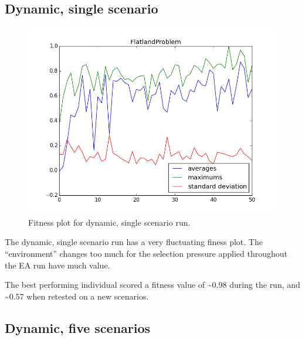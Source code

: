 \documentclass[twoside]{article}
\begin{document}
\begin{multicols}{2}
  \subsection{Dynamic, single scenario}
  
  \begin{figure}[H]
    \centering
    \includegraphics[width=\linewidth]{images/dynamic_1.png}
    \caption{Fitness plot for dynamic, single scenario run.} \label{fig:static-single}
  \end{figure}

  The dynamic, single scenario run has a very fluctuating finess plot.
  The ``environment'' changes too much for the selection pressure applied throughout the EA run have much value.

  The best performing individual scored a fitness value of \textasciitilde $0.98$ during the run, and \textasciitilde $0.57$ when retested on a new scenarios.

  \subsection{Dynamic, five scenarios}
  

\end{multicols}
\end{document}
